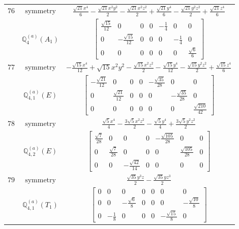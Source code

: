 \documentclass[fleqn,8pt,landscape]{jsarticle}
\begin{document}
\begin{longtable}{ccc}
$ 76 $ & $ \text{symmetry} $ & $ \frac{\sqrt{21} x^{4}}{6} - \frac{\sqrt{21} x^{2} y^{2}}{2} - \frac{\sqrt{21} x^{2} z^{2}}{2} + \frac{\sqrt{21} y^{4}}{6} - \frac{\sqrt{21} y^{2} z^{2}}{2} + \frac{\sqrt{21} z^{4}}{6} $ \\
$  $ & $ \mathbb{Q}_{4}^{(a)}(A_{1}) $ & $ \begin{bmatrix} \frac{\sqrt{15}}{12} & 0 & 0 & 0 & - \frac{1}{4} & 0 & 0 \\ 0 & - \frac{\sqrt{15}}{12} & 0 & 0 & 0 & - \frac{1}{4} & 0 \\ 0 & 0 & 0 & 0 & 0 & 0 & \frac{\sqrt{6}}{6} \end{bmatrix} $ \\ \hline
$ 77 $ & $ \text{symmetry} $ & $ - \frac{\sqrt{15} x^{4}}{12} + \sqrt{15} x^{2} y^{2} - \frac{\sqrt{15} x^{2} z^{2}}{2} - \frac{\sqrt{15} y^{4}}{12} - \frac{\sqrt{15} y^{2} z^{2}}{2} + \frac{\sqrt{15} z^{4}}{6} $ \\
$  $ & $ \mathbb{Q}_{4,1}^{(a)}(E) $ & $ \begin{bmatrix} - \frac{\sqrt{21}}{12} & 0 & 0 & 0 & - \frac{\sqrt{35}}{28} & 0 & 0 \\ 0 & \frac{\sqrt{21}}{12} & 0 & 0 & 0 & - \frac{\sqrt{35}}{28} & 0 \\ 0 & 0 & 0 & 0 & 0 & 0 & \frac{\sqrt{210}}{42} \end{bmatrix} $ \\ \hline
$ 78 $ & $ \text{symmetry} $ & $ \frac{\sqrt{5} x^{4}}{4} - \frac{3 \sqrt{5} x^{2} z^{2}}{2} - \frac{\sqrt{5} y^{4}}{4} + \frac{3 \sqrt{5} y^{2} z^{2}}{2} $ \\
$  $ & $ \mathbb{Q}_{4,2}^{(a)}(E) $ & $ \begin{bmatrix} \frac{\sqrt{7}}{28} & 0 & 0 & 0 & - \frac{\sqrt{105}}{28} & 0 & 0 \\ 0 & \frac{\sqrt{7}}{28} & 0 & 0 & 0 & \frac{\sqrt{105}}{28} & 0 \\ 0 & 0 & - \frac{\sqrt{42}}{14} & 0 & 0 & 0 & 0 \end{bmatrix} $ \\ \hline
$ 79 $ & $ \text{symmetry} $ & $ \frac{\sqrt{35} y^{3} z}{2} - \frac{\sqrt{35} y z^{3}}{2} $ \\
$  $ & $ \mathbb{Q}_{4,1}^{(a)}(T_{1}) $ & $ \begin{bmatrix} 0 & 0 & 0 & 0 & 0 & 0 & 0 \\ 0 & 0 & - \frac{\sqrt{6}}{8} & 0 & 0 & 0 & - \frac{\sqrt{10}}{8} \\ 0 & - \frac{1}{8} & 0 & 0 & 0 & - \frac{\sqrt{15}}{8} & 0 \end{bmatrix} $ \\ \hline

\end{longtable}
\end{document}
